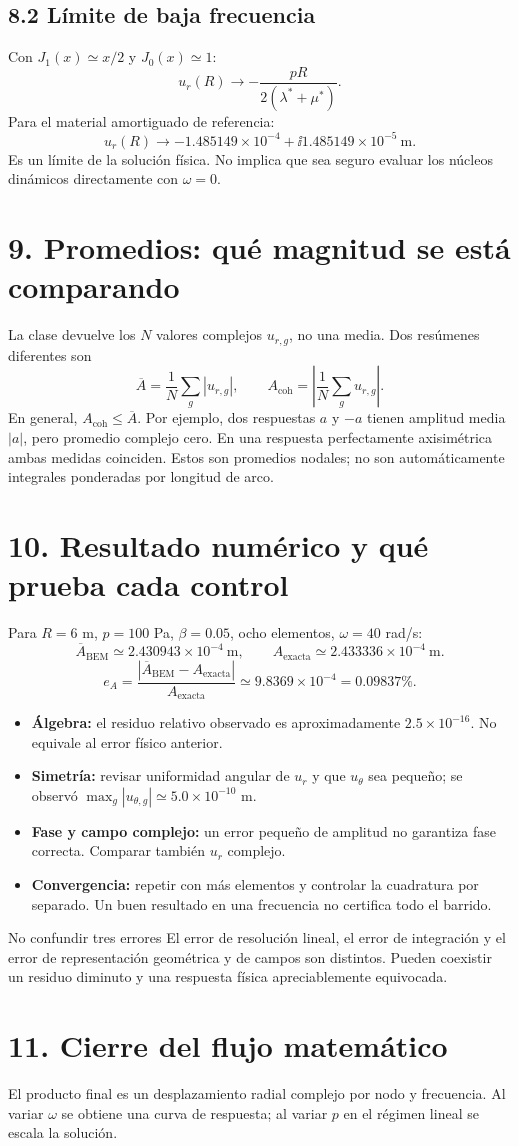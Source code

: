 \documentclass[11pt]{article}
\begin{document}
\subsection*{8.2 Límite de baja frecuencia}
Con \(J_1(x)\simeq x/2\) y \(J_0(x)\simeq1\):
\[
 u_r(R)\longrightarrow-\frac{pR}{2(\lambda^*+\mu^*)}.
\]
Para el material amortiguado de referencia:
\[
 u_r(R)\longrightarrow
 -1.485149\times10^{-4}+\ii1.485149\times10^{-5}\ \mathrm m.
\]
Es un límite de la solución física. No implica que sea seguro evaluar
los núcleos dinámicos directamente con \(\omega=0\).

\newpage
\section*{9. Promedios: qué magnitud se está comparando}
La clase devuelve los \(N\) valores complejos \(u_{r,g}\), no una media.
Dos resúmenes diferentes son
\[
 \overline A=\frac1N\sum_g|u_{r,g}|,\qquad
 A_{\mathrm{coh}}=\left|\frac1N\sum_gu_{r,g}\right|.
\]
En general, \(A_{\mathrm{coh}}\le\overline A\). Por ejemplo, dos respuestas
\(a\) y \(-a\) tienen amplitud media \(|a|\), pero promedio complejo cero.
En una respuesta perfectamente axisimétrica ambas medidas coinciden.
Estos son promedios nodales; no son automáticamente integrales ponderadas
por longitud de arco.

\section*{10. Resultado numérico y qué prueba cada control}
Para \(R=6\) m, \(p=100\) Pa, \(\beta=0.05\), ocho elementos,
\(\omega=40\) rad/s:
\[
 \overline A_{\mathrm{BEM}}\simeq2.430943\times10^{-4}\ \mathrm m,\qquad
 A_{\mathrm{exacta}}\simeq2.433336\times10^{-4}\ \mathrm m.
\]
\[
 e_A=\frac{|\overline A_{\mathrm{BEM}}-A_{\mathrm{exacta}}|}
                {A_{\mathrm{exacta}}}
 \simeq9.8369\times10^{-4}=0.09837\%.
\]
\begin{itemize}
 \item \textbf{Álgebra:} el residuo relativo observado es aproximadamente
 \(2.5\times10^{-16}\). No equivale al error físico anterior.
 \item \textbf{Simetría:} revisar uniformidad angular de \(u_r\) y que
 \(u_\theta\) sea pequeño; se observó
 \(\max_g|u_{\theta,g}|\simeq5.0\times10^{-10}\) m.
 \item \textbf{Fase y campo complejo:} un error pequeño de amplitud no
 garantiza fase correcta. Comparar también \(u_r\) complejo.
 \item \textbf{Convergencia:} repetir con más elementos y controlar la
 cuadratura por separado. Un buen resultado en una frecuencia no certifica
 todo el barrido.
\end{itemize}
\begin{alerta}{No confundir tres errores}
El error de resolución lineal, el error de integración y el error de
representación geométrica y de campos son distintos. Pueden coexistir un
residuo diminuto y una respuesta física apreciablemente equivocada.
\end{alerta}
\section*{11. Cierre del flujo matemático}
El producto final es un desplazamiento radial complejo por nodo y frecuencia.
Al variar \(\omega\) se obtiene una curva de respuesta; al variar \(p\) en
el régimen lineal se escala la solución.
\fuentes
\end{document}
